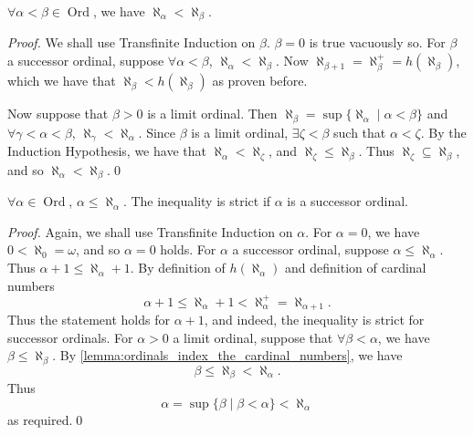 \documentclass[notoc,notitlepage]{tufte-book}
\DeclareMathOperator{\Ord}{Ord }
\begin{document}
\begin{lemma}\label{lemma:ordinals_index_the_cardinal_numbers}
  $\forall \alpha < \beta \in \Ord$, we have $\aleph_\alpha < \aleph_\beta$.
\end{lemma}

\begin{proof}
  We shall use Transfinite Induction on $\beta$. $\beta = 0$ is true vacuously so. For $\beta$ a successor ordinal, suppose  $\forall \alpha < \beta$, $\aleph_\alpha < \aleph_\beta$. Now $\aleph_{\beta + 1} = \aleph_\beta^+ = h(\aleph_\beta)$, which we have that $\aleph_\beta < h(\aleph_\beta)$ as proven before.

  Now suppose that $\beta > 0$ is a limit ordinal. Then $\aleph_\beta = \sup \{ \aleph_\alpha \mid \alpha < \beta \}$ and $\forall \gamma < \alpha < \beta$, $\aleph_\gamma < \aleph_\alpha$. Since $\beta$ is a limit ordinal, $\exists \zeta < \beta$ such that $\alpha < \zeta$. By the Induction Hypothesis, we have that $\aleph_\alpha < \aleph_\zeta$, and $\aleph_\zeta \leq \aleph_\beta$. Thus $\aleph_\zeta \subseteq \aleph_\beta$, and so $\aleph_\alpha < \aleph_\beta$.\qed\
\end{proof}

\begin{lemma}\label{lemma:infinite_cardinals_are_distant}
  $\forall \alpha \in \Ord$, $\alpha \leq \aleph_\alpha$. The inequality is strict if $\alpha$ is a successor ordinal.
\end{lemma}

\begin{proof}
  Again, we shall use Transfinite Induction on $\alpha$. For $\alpha = 0$, we have $0 < \aleph_0 = \omega$, and so $\alpha = 0$ holds. For $\alpha$ a successor ordinal, suppose $\alpha \leq \aleph_\alpha$. Thus $\alpha + 1 \leq \aleph_\alpha + 1$. By definition of $h(\aleph_\alpha)$ and definition of cardinal numbers
  \begin{equation*}
    \alpha + 1 \leq \aleph_\alpha + 1 < \aleph_\alpha^+ = \aleph_{\alpha + 1}.
  \end{equation*}
  Thus the statement holds for $\alpha + 1$, and indeed, the inequality is strict for successor ordinals. For $\alpha > 0$ a limit ordinal, suppose that $\forall \beta < \alpha$, we have $\beta \leq \aleph_\beta$. By \cref{lemma:ordinals_index_the_cardinal_numbers}, we have
  \begin{equation*}
    \beta \leq \aleph_\beta < \aleph_\alpha.
  \end{equation*}
  Thus
  \begin{equation*}
    \alpha = \sup \{ \beta \mid \beta < \alpha \} < \aleph_\alpha
  \end{equation*}
  as required.\qed\
\end{proof}
\end{document}
